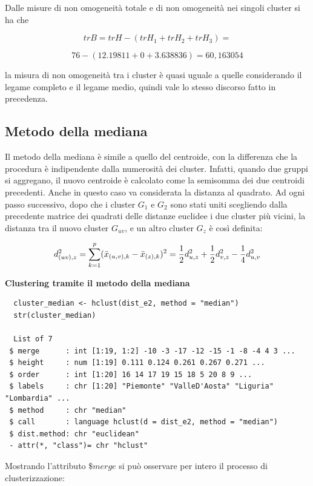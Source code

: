 Dalle misure di non omogeneità totale e di non omogeneità nei singoli cluster si ha che

\[trB = trH - (trH_1 + trH_2 + trH_3) = \]

\[76 - (12.19811 + 0 + 3.638836) = 60,163054\]

\noindent la misura di non omogeneità tra i cluster è quasi uguale a quelle considerando il legame completo e il legame medio, quindi vale lo stesso discorso fatto in precedenza. 

\subsection{Metodo della mediana}\label{cap5.2.5}

Il metodo della mediana è simile a quello del centroide, con la differenza che la procedura è indipendente dalla numerosità dei cluster. Infatti, quando due gruppi si aggregano, il nuovo centroide è calcolato come la semisomma dei due centroidi precedenti. Anche in questo caso va considerata la distanza al quadrato. Ad ogni passo successivo, dopo che i cluster $G_1$ e $G_2$ sono stati uniti scegliendo dalla precedente matrice dei quadrati delle distanze euclidee i due cluster più vicini, la distanza tra il nuovo cluster  $G_{uv}$, e un altro cluster $G_z$ è così definita:

\[d_{(uv),z}^2 = \sum_{k=1}^p(\Bar{x}_{(u,v),k} - \Bar{x}_{(z), k})^2 = \frac{1}{2}d_{u,z}^2 + \frac{1}{2}d_{v,z}^2 - \frac{1}{4}d_{u,v}^2\]

\noindent \textbf{Clustering tramite il metodo della mediana}

\vspace{5mm}
\begin{lstlisting}
  cluster_median <- hclust(dist_e2, method = "median")
  str(cluster_median)

  List of 7
 $ merge      : int [1:19, 1:2] -10 -3 -17 -12 -15 -1 -8 -4 4 3 ...
 $ height     : num [1:19] 0.111 0.124 0.261 0.267 0.271 ...
 $ order      : int [1:20] 16 14 17 19 15 18 5 20 8 9 ...
 $ labels     : chr [1:20] "Piemonte" "ValleD'Aosta" "Liguria" "Lombardia" ...
 $ method     : chr "median"
 $ call       : language hclust(d = dist_e2, method = "median")
 $ dist.method: chr "euclidean"
 - attr(*, "class")= chr "hclust"
\end{lstlisting}
\vspace{5mm}

Mostrando l'attributo $\$merge$ si può osservare per intero il processo di clusterizzazione:

